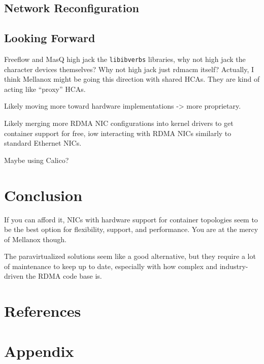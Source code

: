 \documentclass[12pt,titlepage]{article}
\begin{document}
\subsection{Network Reconfiguration}

\subsection{Looking Forward}
Freeflow and MasQ high jack the \texttt{libibverbs} libraries, why not high jack the character devices themselves?
Why not high jack just rdmacm itself?
Actually, I think Mellanox might be going this direction with shared HCAs.
They are kind of acting like ``proxy'' HCAs.

Likely moving more toward hardware implementations -> more proprietary.

Likely merging more RDMA NIC configurations into kernel drivers to get container support for free, iow interacting with RDMA NICs similarly to standard Ethernet NICs.

Maybe using Calico?

\section{Conclusion}
If you can afford it, NICs with hardware support for container topologies seem to be the best option for flexibility, support, and performance.
You are at the mercy of Mellanox though.

The paravirtualized solutions seem like a good alternative, but they require a lot of maintenance to keep up to date, especially with how complex and industry-driven the RDMA code base is.


\nocite{*}
\pagebreak
\section*{References}
\printbibliography[heading=subbibliography,keyword={containers},title={Containers}]{}
\printbibliography[heading=subbibliography,keyword={containernetworking},title={Container Networking}]{}
\printbibliography[heading=subbibliography,keyword={rdmacontainers},title={RDMA in Containers}]{}
\printbibliography[heading=subbibliography,keyword={rdmaresearch},title={RDMA Specific Research}]{}
\printbibliography[heading=subbibliography,keyword={highperfnetworking},title={High Performance Networking}]{}
\printbibliography[heading=subbibliography,keyword={kernelbypassnetworking},title={Kernel Bypass Networking}]{}
\printbibliography[heading=subbibliography,keyword={documentation},title={Documentation}]{}
\printbibliography[heading=subbibliography,keyword={tutorial},title={Tutorials}]{}
\printbibliography[heading=subbibliography,keyword={mellanox},title={Mellanox Infosheets}]{}

\pagebreak
\section*{Appendix}
\appendix
\end{document}
